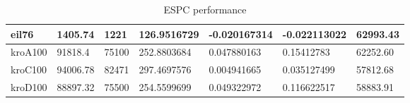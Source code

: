 \begin{table}[H]
\begin{tabular}{|l|p{2cm}|p{1.6cm}|p{2.2cm}|p{2.4cm}|p{2.4cm}|p{1.7cm}|}
		eil76     & 1405.74       & 1221       & 126.9516729     & -0.020167314            & -0.022113022      & 62993.43           \\ \hline
		kroA100   & 91818.4       & 75100      & 252.8803684     & 0.047880163             & 0.15412783        & 62252.60           \\ \hline
		kroC100   & 94006.78      & 82471      & 297.4697576     & 0.004941665             & 0.035127499       & 57812.68           \\ \hline
		kroD100   & 88897.32      & 75500      & 254.5599699     & 0.049322972             & 0.116622517       & 58883.91           \\ \hline
	\end{tabular}
	\caption{ESPC performance}
	\label{tab:espc}
\end{table}
